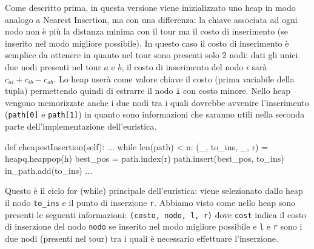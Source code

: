 \documentclass[a4paper,12pt]{report}
\begin{document}
Come descritto prima, in questa versione viene inizializzato uno heap in modo analogo a Nearest Insertion, ma con una differenza: la chiave associata ad ogni nodo non è più la distanza minima con il tour ma il costo di inserimento (se inserito nel modo migliore possibile). In questo caso il costo di inserimento è semplice da ottenere in quanto nel tour sono presenti solo 2 nodi: dati gli unici due nodi presenti nel tour $a$ e $b$, il costo di inserimento del nodo $i$ sarà $c_{ai} + c_{ib} - c_{ab}$. Lo heap userà come valore chiave il costo (prima variabile della tupla) permettendo quindi di estrarre il nodo \lstinline!i! con costo minore. Nello heap vengono memorizzate anche i due nodi tra i quali dovrebbe avvenire l'inserimento (\lstinline!path[0]! e \lstinline!path[1]!) in quanto sono informazioni che saranno utili nella seconda parte dell'implementazione dell'euristica.
\begin{python}
def cheapestInsertion(self):
  ...
  while len(path) < n:
    (_, to_ins, _, r) = heapq.heappop(h)
    best_pos = path.index(r)
    path.insert(best_pos, to_ins)
    in_path.add(to_ins)
    ...
\end{python}
Questo è il ciclo for (while) principale dell'euristica: viene selezionato dallo heap il nodo \lstinline!to_ins! e il punto di inserzione \lstinline!r!. Abbiamo visto come nello heap sono presenti le seguenti informazioni: \lstinline!(costo, nodo, l, r)! dove \lstinline!cost! indica il costo di inserzione del nodo \lstinline!nodo! se inserito nel modo migliore possibile e \lstinline!l! e \lstinline!r! sono i due nodi (presenti nel tour) tra i quali è necessario effettuare l'inserzione.
\end{document}
